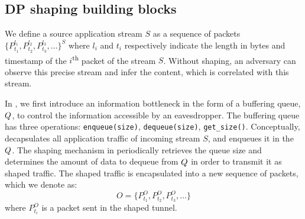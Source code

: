 



\subsection{DP shaping building blocks}
\label{subsec:infromation-bottleneck}
We define a source application stream $S$ as a sequence of packets
$\{P_{t_1}^{l_1}, P_{t_2}^{l_2}, P_{t_3}^{l_3}, \dots \}^S$
where $l_i$ and $t_i$ respectively indicate the length in bytes and timestamp of
the $i$\textsuperscript{th} packet of the stream $S$.
%
Without shaping, an adversary can observe this precise stream and infer
the content, which is correlated with this stream.

In {\sys}, we first introduce an information bottleneck in the form of a
buffering queue, {$Q$}, to control the information accessible by an
eavesdropper. The buffering queue has three operations: \texttt{enqueue(size)},
\texttt{dequeue(size)}, \texttt{get\_size()}.
Conceptually, {\sys} decapsulates all application traffic of incoming stream
$S$, and enqueues it in the {$Q$}.
The shaping mechanism in {\sys} periodically retrieves the queue size and
determines the amount of data to dequeue from $Q$ in order to transmit
it as shaped traffic.
The shaped traffic is encapsulated into a new sequence of packets, which we
denote as:
\begin{equation}\label{equ:stream-segs}
    O = \{P_{t_1}^O, P_{t_2}^O, P_{t_3}^O, \dots\}
\end{equation}
where $P_{t_i}^O$ is a packet sent in the shaped tunnel.

